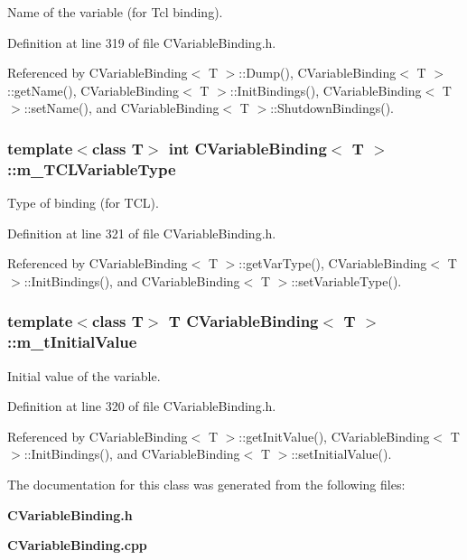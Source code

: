 Name of the variable (for Tcl binding).



Definition at line 319 of file CVariable\-Binding.h.

Referenced by CVariable\-Binding$<$ T $>$::Dump(), CVariable\-Binding$<$ T $>$::get\-Name(), CVariable\-Binding$<$ T $>$::Init\-Bindings(), CVariable\-Binding$<$ T $>$::set\-Name(), and CVariable\-Binding$<$ T $>$::Shutdown\-Bindings().
\subsubsection{\setlength{\rightskip}{0pt plus 5cm}template$<$class T$>$ int CVariable\-Binding$<$ T $>$::m\_\-TCLVariable\-Type\hspace{0.3cm}{\tt  [private]}}\label{classCVariableBinding_o3}


Type of binding (for TCL).



Definition at line 321 of file CVariable\-Binding.h.

Referenced by CVariable\-Binding$<$ T $>$::get\-Var\-Type(), CVariable\-Binding$<$ T $>$::Init\-Bindings(), and CVariable\-Binding$<$ T $>$::set\-Variable\-Type().
\subsubsection{\setlength{\rightskip}{0pt plus 5cm}template$<$class T$>$ T CVariable\-Binding$<$ T $>$::m\_\-t\-Initial\-Value\hspace{0.3cm}{\tt  [private]}}\label{classCVariableBinding_o2}


Initial value of the variable.



Definition at line 320 of file CVariable\-Binding.h.

Referenced by CVariable\-Binding$<$ T $>$::get\-Init\-Value(), CVariable\-Binding$<$ T $>$::Init\-Bindings(), and CVariable\-Binding$<$ T $>$::set\-Initial\-Value().

The documentation for this class was generated from the following files:\begin{CompactItemize}
\item 
{\bf CVariable\-Binding.h}\item 
{\bf CVariable\-Binding.cpp}\end{CompactItemize}
